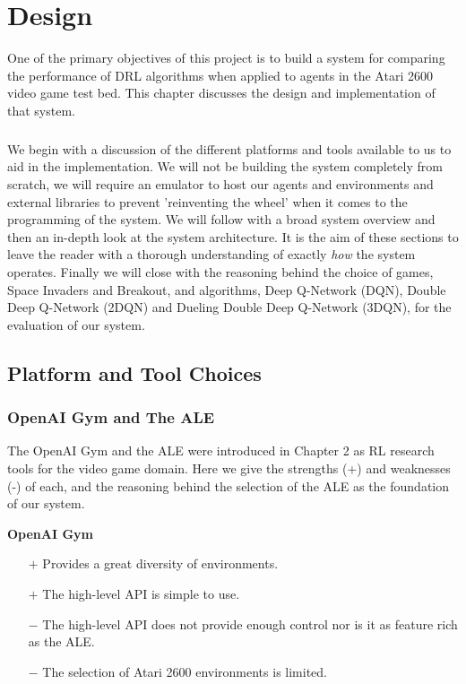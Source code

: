 \chapter{Design}
One of the primary objectives of this project is to build a system for comparing the performance of DRL algorithms when applied to agents in the Atari 2600 video game test bed. This chapter discusses the design and implementation of that system. \paragraph{}

We begin with a discussion of the different platforms and tools available to us to aid in the implementation. We will not be building the system completely from scratch, we will require an emulator to host our agents and environments and external libraries to prevent 'reinventing the wheel' when it comes to the programming of the system. We will follow with a broad system overview and then an in-depth look at the system architecture. It is the aim of these sections to leave the reader with a thorough understanding of exactly \textit{how} the system operates. Finally we will close with the reasoning behind the choice of games, Space Invaders and Breakout, and algorithms, Deep Q-Network (DQN), Double Deep Q-Network (2DQN) and Dueling Double Deep Q-Network (3DQN), for the evaluation of our system.

\section{Platform and Tool Choices}
\subsection{OpenAI Gym and The ALE}
The OpenAI Gym and the ALE were introduced in Chapter 2 as RL research tools for the video game domain. Here we give the strengths (+) and weaknesses (-) of each, and the reasoning behind the selection of the ALE as the foundation of our system.

\textbf{OpenAI Gym}
\begin{itemize}
    \item[$+$] Provides a great diversity of environments.
    \item[$+$] The high-level API is simple to use.
    \item[$-$] The high-level API does not provide enough control nor is it as feature rich as the ALE.
    \item[$-$] The selection of Atari 2600 environments is limited.
\end{itemize}

